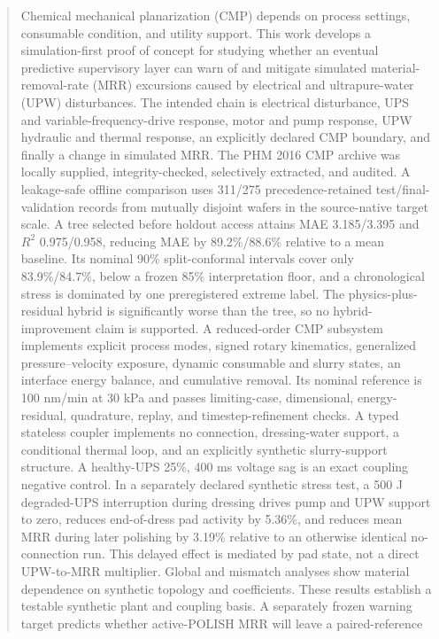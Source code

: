 \documentclass[10pt,twocolumn]{article}
\begin{document}
\begin{abstract}
Chemical mechanical planarization (CMP) depends on process settings,
consumable condition, and utility support. This work develops a
simulation-first proof of concept for studying whether an eventual predictive
supervisory layer can warn of and mitigate simulated material-removal-rate
(MRR) excursions caused by electrical and ultrapure-water (UPW)
disturbances. The intended chain is electrical disturbance, UPS and
variable-frequency-drive response, motor and pump response, UPW hydraulic and
thermal response, an explicitly declared CMP boundary, and finally a change
in simulated MRR. The PHM 2016 CMP archive was locally supplied,
integrity-checked, selectively extracted, and audited. A leakage-safe offline
comparison uses 311/275 precedence-retained test/final-validation records from
mutually disjoint wafers in the source-native target scale. A tree selected
before holdout access attains MAE 3.185/3.395 and $R^2$ 0.975/0.958, reducing
MAE by 89.2\%/88.6\% relative to a mean baseline. Its nominal 90\%
split-conformal intervals cover only 83.9\%/84.7\%, below a frozen 85\%
interpretation floor, and a chronological stress is dominated by one
preregistered extreme label. The physics-plus-residual hybrid is significantly
worse than the tree, so no hybrid-improvement claim is supported. A
reduced-order CMP subsystem
implements explicit process modes, signed rotary kinematics, generalized
pressure--velocity exposure, dynamic consumable and slurry states, an
interface energy balance, and cumulative removal. Its nominal reference is
100 nm/min at 30 kPa and passes limiting-case, dimensional, energy-residual,
quadrature, replay, and timestep-refinement checks. A typed stateless coupler
implements no connection, dressing-water support, a conditional thermal loop,
and an explicitly synthetic slurry-support structure. A healthy-UPS 25\%,
400 ms voltage sag is an exact coupling negative control. In a separately
declared synthetic stress test, a 500 J degraded-UPS interruption during
dressing drives pump and UPW support to zero, reduces end-of-dress pad activity
by 5.36\%, and reduces mean MRR during later polishing by 3.19\% relative to an
otherwise identical no-connection run. This delayed effect is mediated by pad
state, not a direct UPW-to-MRR multiplier. Global and mismatch analyses show
material dependence on synthetic topology and coefficients. These results
establish a testable synthetic plant and coupling basis. A separately frozen
warning target predicts whether active-POLISH MRR will leave a paired-reference

\end{abstract}
\end{document}
